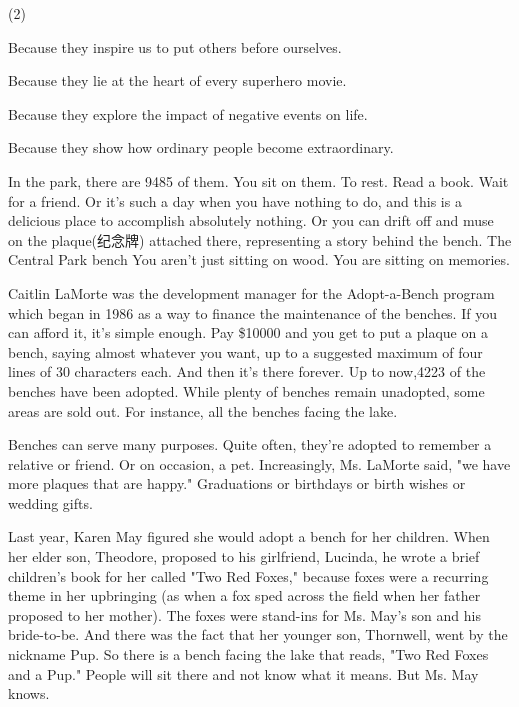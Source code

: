 \documentclass{英语试卷}
\begin{document}
\begin{choices}(2)
  \item Because they inspire us to put others before ourselves.
  \item Because they lie at the heart of every superhero movie.
  \item Because they explore the impact of negative events on life.
  \item Because they show how ordinary people become extraordinary.
\end{choices}
\par In the park, there are 9485 of them. You sit on them. To rest. Read a book. Wait for a friend. Or it's such a day when you have nothing to do, and this is a delicious place to accomplish absolutely nothing. Or you can drift off and muse on the plaque(纪念牌) attached there, representing a story behind the bench. The Central Park bench You aren't just sitting on wood. You are sitting on memories.\par
\par Caitlin LaMorte was the development manager for the Adopt-a-Bench program which began in 1986 as a way to finance the maintenance of the benches. If you can afford it, it's simple enough. Pay \$10000 and you get to put a plaque on a bench, saying almost whatever you want, up to a suggested maximum of four lines of 30 characters each. And then it's there forever. Up to now,4223 of the benches have been adopted. While plenty of benches remain unadopted, some areas are sold out. For instance, all the benches facing the lake.\par
\par Benches can serve many purposes. Quite often, they're adopted to remember a relative or friend. Or on occasion, a pet. Increasingly, Ms. LaMorte said, "we have more plaques that are happy." Graduations or birthdays or birth wishes or wedding gifts.\par
\par Last year, Karen May figured she would adopt a bench for her children. When her elder son, Theodore, proposed to his girlfriend, Lucinda, he wrote a brief children's book for her called "Two Red Foxes," because foxes were a recurring theme in her upbringing (as when a fox sped across the field when her father proposed to her mother). The foxes were stand-ins for Ms. May's son and his bride-to-be. And there was the fact that her younger son, Thornwell, went by the nickname Pup. So there is a bench facing the lake that reads, "Two Red Foxes and a Pup." People will sit there and not know what it means. But Ms. May knows.\par
\end{document}
